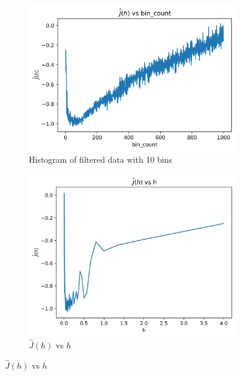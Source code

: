 \begin{figure}
    \centering
    \begin{subfigure}{0.45\textwidth}
        \centering
        \includegraphics[width=\linewidth]{../q1/images/bins.png}
        \caption{Histogram of filtered data with 10 bins}
        \label{fig:q1_2_a}
    \end{subfigure}
    \begin{subfigure}{0.45\textwidth}
        \centering
        \includegraphics[width=\linewidth]{../q1/images/crossvalidation.png}
        \caption{$\hat{J}(h)$ vs $h$}
        \label{fig:q1_2_c}
    \end{subfigure}
\end{figure}

